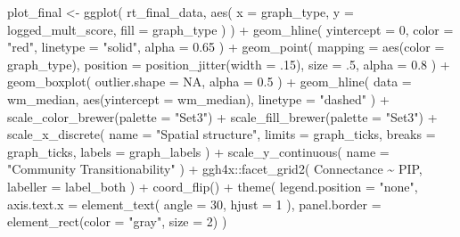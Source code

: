\documentclass[
]{book}
\newenvironment{Shaded}{\begin{snugshade}}{\end{snugshade}}
\newcommand{\AttributeTok}[1]{\textcolor[rgb]{0.77,0.63,0.00}{#1}}
\newcommand{\ConstantTok}[1]{\textcolor[rgb]{0.00,0.00,0.00}{#1}}
\newcommand{\DecValTok}[1]{\textcolor[rgb]{0.00,0.00,0.81}{#1}}
\newcommand{\FloatTok}[1]{\textcolor[rgb]{0.00,0.00,0.81}{#1}}
\newcommand{\FunctionTok}[1]{\textcolor[rgb]{0.00,0.00,0.00}{#1}}
\newcommand{\NormalTok}[1]{#1}
\newcommand{\OtherTok}[1]{\textcolor[rgb]{0.56,0.35,0.01}{#1}}
\newcommand{\SpecialCharTok}[1]{\textcolor[rgb]{0.00,0.00,0.00}{#1}}
\newcommand{\StringTok}[1]{\textcolor[rgb]{0.31,0.60,0.02}{#1}}
\begin{document}
\begin{Shaded}
\begin{Highlighting}[]
\NormalTok{plot\_final }\OtherTok{\textless{}{-}} \FunctionTok{ggplot}\NormalTok{(}
\NormalTok{    rt\_final\_data,}
    \FunctionTok{aes}\NormalTok{(}
      \AttributeTok{x =}\NormalTok{ graph\_type,}
      \AttributeTok{y =}\NormalTok{ logged\_mult\_score,}
      \AttributeTok{fill =}\NormalTok{ graph\_type}
\NormalTok{    )}
\NormalTok{  ) }\SpecialCharTok{+}
  \FunctionTok{geom\_hline}\NormalTok{(}
    \AttributeTok{yintercept =} \DecValTok{0}\NormalTok{,}
    \AttributeTok{color =} \StringTok{"red"}\NormalTok{,}
    \AttributeTok{linetype =} \StringTok{"solid"}\NormalTok{,}
    \AttributeTok{alpha =} \FloatTok{0.65}
\NormalTok{  ) }\SpecialCharTok{+}
  \FunctionTok{geom\_point}\NormalTok{(}
    \AttributeTok{mapping =} \FunctionTok{aes}\NormalTok{(}\AttributeTok{color =}\NormalTok{ graph\_type),}
    \AttributeTok{position =} \FunctionTok{position\_jitter}\NormalTok{(}\AttributeTok{width =}\NormalTok{ .}\DecValTok{15}\NormalTok{),}
    \AttributeTok{size =}\NormalTok{ .}\DecValTok{5}\NormalTok{,}
    \AttributeTok{alpha =} \FloatTok{0.8}
\NormalTok{  ) }\SpecialCharTok{+}
  \FunctionTok{geom\_boxplot}\NormalTok{(}
    \AttributeTok{outlier.shape =} \ConstantTok{NA}\NormalTok{,}
    \AttributeTok{alpha =} \FloatTok{0.5}
\NormalTok{  ) }\SpecialCharTok{+}
  \FunctionTok{geom\_hline}\NormalTok{(}
    \AttributeTok{data =}\NormalTok{ wm\_median,}
    \FunctionTok{aes}\NormalTok{(}\AttributeTok{yintercept =}\NormalTok{ wm\_median),}
    \AttributeTok{linetype =} \StringTok{"dashed"}
\NormalTok{  ) }\SpecialCharTok{+}
  \FunctionTok{scale\_color\_brewer}\NormalTok{(}\AttributeTok{palette =} \StringTok{"Set3"}\NormalTok{) }\SpecialCharTok{+}
  \FunctionTok{scale\_fill\_brewer}\NormalTok{(}\AttributeTok{palette =} \StringTok{"Set3"}\NormalTok{) }\SpecialCharTok{+}
  \FunctionTok{scale\_x\_discrete}\NormalTok{(}
    \AttributeTok{name =} \StringTok{"Spatial structure"}\NormalTok{,}
    \AttributeTok{limits =}\NormalTok{ graph\_ticks,}
    \AttributeTok{breaks =}\NormalTok{ graph\_ticks,}
    \AttributeTok{labels =}\NormalTok{ graph\_labels}
\NormalTok{  ) }\SpecialCharTok{+}
  \FunctionTok{scale\_y\_continuous}\NormalTok{(}
    \AttributeTok{name =} \StringTok{"Community Transitionability"}
\NormalTok{  ) }\SpecialCharTok{+}
\NormalTok{  ggh4x}\SpecialCharTok{::}\FunctionTok{facet\_grid2}\NormalTok{(}
\NormalTok{    Connectance }\SpecialCharTok{\textasciitilde{}}\NormalTok{ PIP,}
    \AttributeTok{labeller =}\NormalTok{ label\_both}
\NormalTok{  ) }\SpecialCharTok{+}
  \FunctionTok{coord\_flip}\NormalTok{() }\SpecialCharTok{+}
  \FunctionTok{theme}\NormalTok{(}
    \AttributeTok{legend.position =} \StringTok{"none"}\NormalTok{,}
    \AttributeTok{axis.text.x =} \FunctionTok{element\_text}\NormalTok{(}
      \AttributeTok{angle =} \DecValTok{30}\NormalTok{,}
      \AttributeTok{hjust =} \DecValTok{1}
\NormalTok{    ),}
    \AttributeTok{panel.border =} \FunctionTok{element\_rect}\NormalTok{(}\AttributeTok{color =} \StringTok{"gray"}\NormalTok{, }\AttributeTok{size =} \DecValTok{2}\NormalTok{)}
\NormalTok{  )}


\end{Highlighting}
\end{Shaded}
\end{document}
